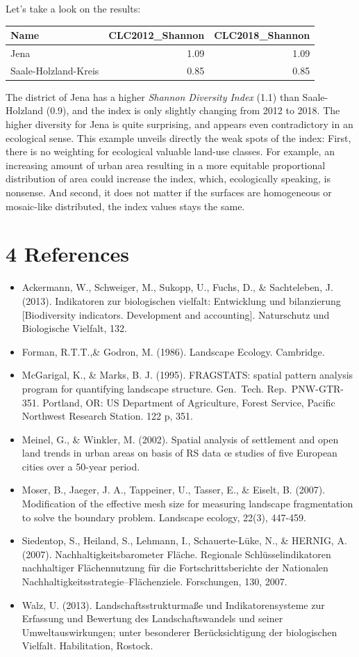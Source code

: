 \documentclass[]{article}
\begin{document}
Let's take a look on the results:

\begin{longtable}[]{@{}lrr@{}}
\toprule
Name & CLC2012\_Shannon & CLC2018\_Shannon\tabularnewline
\midrule
\endhead
Jena & 1.09 & 1.09\tabularnewline
Saale-Holzland-Kreis & 0.85 & 0.85\tabularnewline
\bottomrule
\end{longtable}

The district of Jena has a higher \emph{Shannon Diversity Index} (1.1)
than Saale-Holzland (0.9), and the index is only slightly changing from
2012 to 2018. The higher diversity for Jena is quite surprising, and
appears even contradictory in an ecological sense. This example unveils
directly the weak spots of the index: First, there is no weighting for
ecological valuable land-use classes. For example, an increasing amount
of urban area resulting in a more equitable proportional distribution of
area could increase the index, which, ecologically speaking, is
nonsense. And second, it does not matter if the surfaces are homogeneous
or mosaic-like distributed, the index values stays the same.

\section{4 References}\label{references}

\begin{itemize}
\item
  Ackermann, W., Schweiger, M., Sukopp, U., Fuchs, D., \& Sachteleben,
  J. (2013). Indikatoren zur biologischen vielfalt: Entwicklung und
  bilanzierung {[}Biodiversity indicators. Development and
  accounting{]}. Naturschutz und Biologische Vielfalt, 132.
\item
  Forman, R.T.T.,\& Godron, M. (1986). Landscape Ecology. Cambridge.
\item
  McGarigal, K., \& Marks, B. J. (1995). FRAGSTATS: spatial pattern
  analysis program for quantifying landscape structure. Gen.~Tech.
  Rep.~PNW-GTR-351. Portland, OR: US Department of Agriculture, Forest
  Service, Pacific Northwest Research Station. 122 p, 351.
\item
  Meinel, G., \& Winkler, M. (2002). Spatial analysis of settlement and
  open land trends in urban areas on basis of RS data œ studies of five
  European cities over a 50-year period.
\item
  Moser, B., Jaeger, J. A., Tappeiner, U., Tasser, E., \& Eiselt, B.
  (2007). Modification of the effective mesh size for measuring
  landscape fragmentation to solve the boundary problem. Landscape
  ecology, 22(3), 447-459.
\item
  Siedentop, S., Heiland, S., Lehmann, I., Schauerte-Lüke, N., \&
  HERNIG, A. (2007). Nachhaltigkeitsbarometer Fläche. Regionale
  Schlüsselindikatoren nachhaltiger Flächennutzung für die
  Fortschrittsberichte der Nationalen
  Nachhaltigkeitsstrategie--Flächenziele. Forschungen, 130, 2007.
\item
  Walz, U. (2013). Landschaftsstrukturmaße und Indikatorensysteme zur
  Erfassung und Bewertung des Landschaftswandels und seiner
  Umweltauswirkungen; unter besonderer Berücksichtigung der biologischen
  Vielfalt. Habilitation, Rostock.
\end{itemize}
\end{document}
